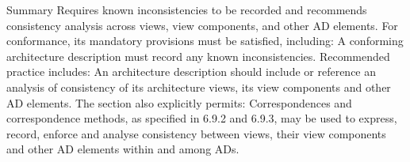 \documentclass[10pt,letterpaper]{article}
\begin{document}
\begin{CornellSummaryBox}{Summary}
Requires known inconsistencies to be recorded and recommends consistency analysis across views, view components, and other AD elements. For conformance, its mandatory provisions must be satisfied, including: A conforming architecture description must record any known inconsistencies. Recommended practice includes: An architecture description should include or reference an analysis of consistency of its architecture views, its view components and other AD elements. The section also explicitly permits: Correspondences and correspondence methods, as specified in 6.9.2 and 6.9.3, may be used to express, record, enforce and analyse consistency between views, their view components and other AD elements within and among ADs.
\end{CornellSummaryBox}
\end{document}
